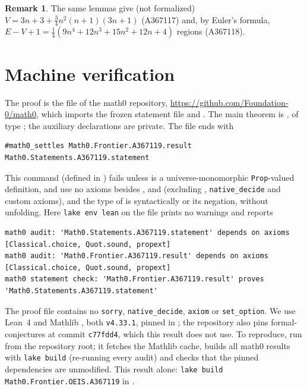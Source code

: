 \documentclass[11pt]{amsart}
\theoremstyle{plain}
\theoremstyle{definition}
\newtheorem{remark}[theorem]{Remark}
\begin{document}
\begin{remark}
The same lemmas give (not formalized) $V=3n+3+\frac34n^2(n+1)(3n+1)$ (A367117) and, by Euler's formula, $E-V+1=\frac14(9n^4+12n^3+15n^2+12n+4)$ regions (A367118).
\end{remark}

\section{Machine verification}\label{sec:lean}

The proof is the file  of the math0 repository, \url{https://github.com/Foundation-0/math0}, which imports the frozen statement file and . The main theorem is , of type ; the auxiliary declarations are private. The file ends with
\begin{lstlisting}
#math0_settles Math0.Frontier.A367119.result Math0.Statements.A367119.statement
\end{lstlisting}
This command (defined in ) fails unless  is a universe-monomorphic \texttt{Prop}-valued definition,  and  use no axioms besides ,  and  (excluding , \texttt{native\_decide} and custom axioms), and the type of  is syntactically  or its negation, without unfolding. Here \texttt{lake env lean} on the file prints no warnings and reports
\begin{lstlisting}[basicstyle=\ttfamily\scriptsize]
math0 audit: 'Math0.Statements.A367119.statement' depends on axioms [Classical.choice, Quot.sound, propext]
math0 audit: 'Math0.Frontier.A367119.result' depends on axioms [Classical.choice, Quot.sound, propext]
math0 statement check: 'Math0.Frontier.A367119.result' proves 'Math0.Statements.A367119.statement'
\end{lstlisting}
The proof file contains no \texttt{sorry}, \texttt{native\_decide}, \texttt{axiom} or \texttt{set\_option}. We use Lean~4 \cite{Lean4} and Mathlib \cite{Mathlib}, both \texttt{v4.33.1}, pinned in ; the repository also pins formal-conjectures \cite{FC} at commit \texttt{c77fdd4}, which this result does not use. To reproduce, run  from the repository root; it fetches the Mathlib cache, builds all math0 results with \texttt{lake build} (re-running every audit) and checks that the pinned dependencies are unmodified. This result alone: \texttt{lake build Math0.Frontier.OEIS.A367119} in .
\end{document}
